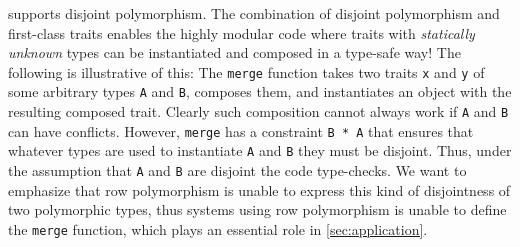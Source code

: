 \name supports disjoint polymorphism. The combination of disjoint
polymorphism and first-class traits enables the highly modular code
where traits with \emph{statically unknown} types can be instantiated
and composed in a type-safe way! The following is illustrative of this:
The \lstinline{merge} function takes two traits \lstinline{x} and \lstinline{y} of
some arbitrary types \lstinline{A} and \lstinline{B}, composes them,
and instantiates an object with the resulting composed trait. Clearly
such composition cannot always work if \lstinline{A} and
\lstinline{B} can have conflicts. However, \lstinline{merge} has a
constraint \lstinline{B * A} that ensures that whatever types are used
to instantiate \lstinline{A} and \lstinline{B} they must be disjoint.
Thus, under the assumption that \lstinline{A} and \lstinline{B} are
disjoint the code type-checks. We want to emphasize that row polymorphism is unable to express
this kind of disjointness of two polymorphic types, thus systems using row polymorphism is unable to define
the \lstinline{merge} function, which plays an essential role in \cref{sec:application}.

\begin{comment}
Notice the disjoint constraint on the type variable \lstinline{B} (\lstinline{B * A}), which is crucial
to ensure the composition of two traits \lstinline{x} and \lstinline{y} is conflict-free.
As far as we are aware, no mainstream statically typed OO languages can do this.
\end{comment}


